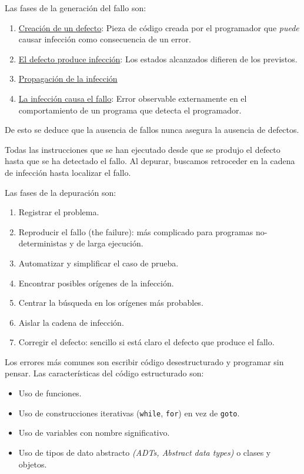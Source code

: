 Las fases de la generación del fallo son:
\begin{enumerate}
    \item \underline{Creación de un defecto}: Pieza de código creada por el programador que \textit{puede} causar infección como consecuencia de un error.

    \item \underline{El defecto produce infección}: Los estados alcanzados difieren de los previstos.

    \item \underline{Propagación de la infección}

    \item \underline{La infección causa el fallo}: Error observable externamente en el comportamiento de un programa que detecta el programador.
\end{enumerate}

De esto se deduce que la ausencia de fallos nunca asegura la ausencia de defectos.

\begin{definicion} Todas las instrucciones que se han ejecutado desde que se produjo el defecto hasta que se ha detectado el fallo. Al depurar, buscamos retroceder en la cadena de infección hasta localizar el fallo.
\end{definicion}


Las fases de la depuración son:
\begin{enumerate}
    \item Registrar el problema.
    \item Reproducir el fallo (the failure): más complicado para programas no-deterministas y de larga ejecución.
    \item Automatizar y simplificar el caso de prueba.
    \item Encontrar posibles orígenes de la infección.
    \item Centrar la búsqueda en los orígenes más probables.
    \item Aislar la cadena de infección.
    \item Corregir el defecto: sencillo si está claro el defecto que produce el fallo.
\end{enumerate}


Los errores más comunes son escribir código desestructurado y programar sin pensar. Las características del código estructurado son:
\begin{itemize}
    \item Uso de funciones.
    \item Uso de construcciones iterativas (\verb|while|, \verb|for|) en vez de \verb|goto|.
    \item Uso de variables con nombre significativo.
    \item Uso de tipos de dato abstracto \textit{(ADTs, Abstract data types)} o clases y objetos.
\end{itemize}


